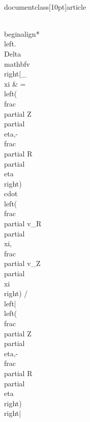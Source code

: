 \\documentclass[10pt]{article}
\begin{document}
{\\begin{align*}
\\left.\\Delta \\mathbf{v}\\right|_{\\xi} & =\\left(\\frac{\\partial Z}{\\partial \\eta},-\\frac{\\partial R}{\\partial \\eta}\\right) \\cdot\\left(\\frac{\\partial v_{R}}{\\partial \\xi}, \\frac{\\partial v_{Z}}{\\partial \\xi}\\right) /\\left|\\left(\\frac{\\partial Z}{\\partial \\eta},-\\frac{\\partial R}{\\partial \\eta}\\right)\\right| \\\\
}
\end{document}
